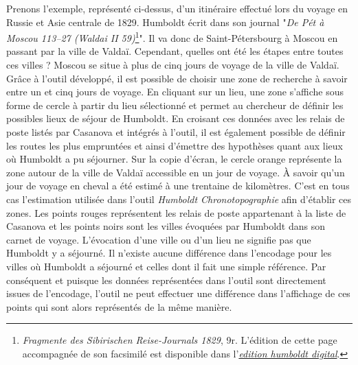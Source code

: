 \documentclass[a4paper, 12pt, twoside]{book}
\begin{document}
Prenons l'exemple, représenté ci-dessus, d'un itinéraire effectué lors du voyage en Russie et Asie centrale de 1829. Humboldt écrit dans son journal "\textit{De Pét à Moscou 113–27 (Waldai II 59)}\footnote{\textit{Fragmente des Sibirischen Reise-Journals 1829}, 9r. L'édition de cette page accompagnée de son facsimilé est disponible dans l'\textit{\href{https://edition-humboldt.de/reisetagebuecher/detail.xql?id=H0005449&view=f&l=de&page=9r}{edition humboldt digital}}.}". Il va donc de Saint-Pétersbourg à Moscou en passant par la ville de Valdaï. Cependant, quelles ont été les étapes entre toutes ces villes ? Moscou se situe à plus de cinq jours de voyage de la ville de Valdaï. Grâce à l'outil développé, il est possible de choisir une zone de recherche à savoir entre un et cinq jours de voyage. En cliquant sur un lieu, une zone s'affiche sous forme de cercle à partir du lieu sélectionné et permet au chercheur de définir les possibles lieux de séjour de Humboldt. En croisant ces données avec les relais de poste listés par Casanova et intégrés à l'outil, il est également possible de définir les routes les plus empruntées et ainsi d'émettre des hypothèses quant aux lieux où Humboldt a pu séjourner. Sur la copie d'écran, le cercle orange représente la zone autour de la ville de Valdaï accessible en un jour de voyage. À savoir qu'un jour de voyage en cheval a été estimé à une trentaine de kilomètres. C'est en tous cas l'estimation utilisée dans l'outil \textit{Humboldt Chronotopographie} afin d'établir ces zones. Les points rouges représentent les relais de poste appartenant à la liste de Casanova et les points noirs sont les villes évoquées par Humboldt dans son carnet de voyage. L'évocation d'une ville ou d'un lieu ne signifie pas que Humboldt y a séjourné. Il n'existe aucune différence dans l'encodage pour les villes où Humboldt a séjourné et celles dont il fait une simple référence. Par conséquent et puisque les données représentées dans l'outil sont directement issues de l'encodage, l'outil ne peut effectuer une différence dans l'affichage de ces points qui sont alors représentés de la même manière.
\end{document}
